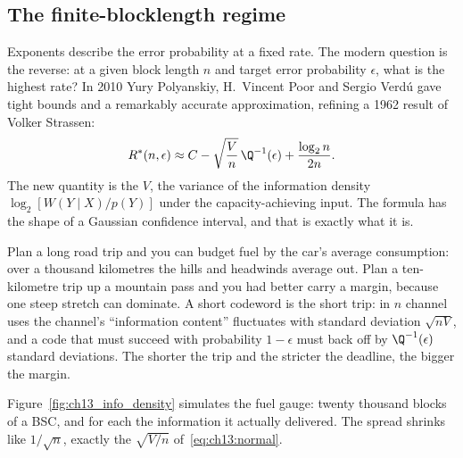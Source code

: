 
\subsection{The finite-blocklength regime}
\label{sec:ch13:fbl}

Exponents describe the error probability at a fixed rate. The modern question is the reverse: at
a given block length $n$ and target error probability $\epsilon$, what is the highest rate? In
2010 Yury Polyanskiy, H.~Vincent Poor and Sergio Verd\'u gave tight bounds and a remarkably accurate
approximation, refining a 1962 result of Volker Strassen:
\begin{equation}
R^*(n,\epsilon)\approx C-\sqrt{\frac Vn}\,\Q^{-1}(\epsilon)+\frac{\log_2n}{2n}.
\label{eq:ch13:normal}
\end{equation}
The new quantity is the  $V$, the variance of the information density
$\log_2[W(Y\mid X)/p(Y)]$ under the capacity-achieving input. The formula has the shape of a
Gaussian confidence interval, and that is exactly what it is.

\begin{analogy}
Plan a long road trip and you can budget fuel by the car's average consumption: over a thousand
kilometres the hills and headwinds average out. Plan a ten-kilometre trip up a mountain pass and
you had better carry a margin, because one steep stretch can dominate. A short codeword is the
short trip: in $n$ channel uses the channel's ``information content'' fluctuates with standard
deviation $\sqrt{nV}$, and a code that must succeed with probability $1-\epsilon$ must back off by
$\Q^{-1}(\epsilon)$ standard deviations. The shorter the trip and the stricter the deadline, the
bigger the margin.
\end{analogy}

Figure~\ref{fig:ch13_info_density} simulates the fuel gauge: twenty thousand blocks of a BSC, and
for each the information it actually delivered. The spread shrinks like $1/\sqrt n$, exactly the
$\sqrt{V/n}$ of~\eqref{eq:ch13:normal}.

